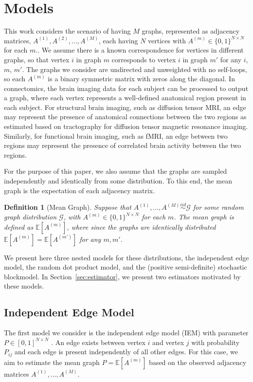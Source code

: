 \documentclass[10pt,letterpaper]{article}
\newtheorem{definition}[fact]{Definition}
\newcommand{\Ex}{\mathbb{E}}
\begin{document}
\section{Models}
\label{section:model}
This work considers the scenario of having $M$ graphs, represented as adjacency matrices, $A^{(1)},A^{(2)},\dotsc,A^{(M)}$, each having $N$ vertices with $A^{(m)}\in\{0,1\}^{N\times N}$ for each $m$..
We assume there is a known correspondence for vertices in different graphs, so that vertex $i$ in graph $m$ corresponds to vertex $i$ in graph $m'$ for any $i$, $m$, $m'$.
The graphs we consider are undirected and unweighted with no self-loops, so each $A^{(m)}$ is a binary symmetric matrix with zeros along the diagonal. 
In connectomics, the  brain imaging data for each subject can be processed  to output a graph, where each vertex represents a well-defined anatomical region present in each subject.
For structural brain imaging, such as diffusion tensor MRI, an edge may represent the presence of anatomical connections between the two regions as estimated based on tractography for diffusion tensor magnetic resonance imaging.
Similarly, for functional brain imaging, such as fMRI, an edge between two regions may represent the presence of correlated brain activity between the two regions. 


For the purpose of this paper, we also assume that the graphs are sampled independently and identically from some distribution.
To this end, the mean graph is the expectation of each adjacency matrix.
\begin{definition}[Mean Graph]
Suppose that $A^{(1)},\dotsc,A^{(M)}\stackrel{iid}{\sim} \mathcal{G}$ for some random graph distribution $\mathcal{G}$, with $A^{(m)}\in\{0,1\}^{N\times N}$ for each $m$.
The {\em mean graph} is defined as $\Ex[A^{(m)}]$, where since the graphs are identically distributed $\Ex[A^{(m)}]=\Ex[A^{(m')}]$ for any $m,m'$.
\end{definition}

We present here three nested models for these distributions, the independent edge model, the random dot product model, and the (positive semi-definite) stochastic blockmodel.
In Section~\ref{sec:estimator}, we present two estimators motivated by these models.



\subsection{Independent Edge Model}
The first model we consider is the independent edge model (IEM) with parameter $P \in [0,1]^{N\times N}$ \citep{bollobas2007phase}.
An edge exists between vertex $i$ and vertex $j$ with probability $P_{ij}$ and each edge is present independently of all other edges. 
For this case, we aim to estimate the mean graph $P=\Ex[A^{(m)}]$ based on the observed adjacency matrices $A^{(1)},\dotsc,A^{(M)}$.
\end{document}

